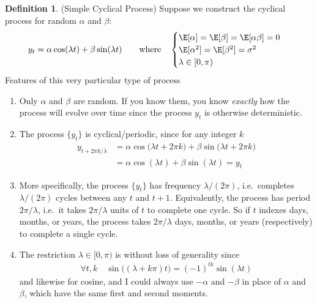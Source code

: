 \documentclass[12pt]{article}
\theoremstyle{plain}
\theoremstyle{definition}
\newtheorem{defn}[thm]{Definition}
\theoremstyle{remark}
\begin{document}
\begin{defn}(Simple Cyclical Process)
Suppose we construct the cyclical process
for random $\alpha$ and $\beta$:
\begin{align*}
  y_t = \alpha \cos(\lambda t) + \beta \sin(\lambda t)
  \qquad
  \text{where}\quad
  \begin{cases}
    \E[\alpha] = \E[\beta] = \E[\alpha \beta] = 0
    \\
    \E[\alpha^2] = \E[\beta^2] = \sigma^2
    \\
    \lambda \in [0,\pi)
  \end{cases}
\end{align*}
Features of this very particular type of process
\begin{enumerate}[label=(\roman*)]
  \item Only $\alpha$ and $\beta$ are random. If you know them, you know
    \emph{exactly} how the process will evolve over time since the
    process $y_t$ is otherwise deterministic.
  \item The process $\{y_t\}$ is cyclical/periodic, since for any
    integer $k$
    \begin{align*}
      y_{t+2\pi k/\lambda}
      &= \alpha \cos\big(\lambda t+2\pi k\big)
      +\beta \sin\big(\lambda t +2\pi k\big)
      \\
      &= \alpha \cos(\lambda t)
      +\beta \sin(\lambda t)
      = y_t
    \end{align*}

  \item
    More specifically, the process $\{y_t\}$ has frequency
    $\lambda/(2\pi)$, i.e.\ completes $\lambda/(2\pi)$ cycles between
    any $t$ and $t+1$.  Equivalently, the process has period
    $2\pi/\lambda$, i.e.\ it takes $2\pi/\lambda$ units of $t$ to
    complete one cycle. So if $t$ indexes days, months, or years, the
    process takes $2\pi/\lambda$ days, months, or years (respectively)
    to complete a single cycle.

  \item The restriction $\lambda \in[0,\pi)$ is without loss of
    generality since
    \begin{align*}
      \forall t,k
      \quad
      \sin\big((\lambda + k\pi)t\big)
      =
      (-1)^{tk}\sin(\lambda t)
    \end{align*}
    and likewise for cosine, and I could always use $-\alpha$ and
    $-\beta$ in place of $\alpha$ and $\beta$, which have the same first
    and second moments.


\end{enumerate}
\end{defn}
\end{document}
